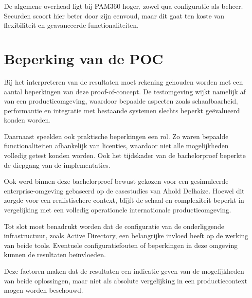De algemene overhead ligt bij PAM360 hoger, zowel qua configuratie als beheer. Securden scoort hier beter door zijn eenvoud, maar dit gaat ten koste van flexibiliteit en geavanceerde functionaliteiten.
\section{Beperking van de POC}
Bij het interpreteren van de resultaten moet rekening gehouden worden met een aantal beperkingen van deze proof-of-concept. De testomgeving wijkt namelijk af van een productieomgeving, waardoor bepaalde aspecten zoals schaalbaarheid, performantie en integratie met bestaande systemen slechts beperkt geëvalueerd konden worden.

Daarnaast speelden ook praktische beperkingen een rol. Zo waren bepaalde functionaliteiten afhankelijk van licenties, waardoor niet alle mogelijkheden volledig getest konden worden. Ook het tijdskader van de bachelorproef beperkte de diepgang van de implementaties.

Ook werd binnen deze bachelorproef bewust gekozen voor een gesimuleerde enterprise-omgeving gebaseerd op de casestudies van Ahold Delhaize. Hoewel dit zorgde voor een realistischere context, blijft de schaal en complexiteit beperkt in vergelijking met een volledig operationele internationale productieomgeving.

Tot slot moet benadrukt worden dat de configuratie van de onderliggende infrastructuur, zoals Active Directory, een belangrijke invloed heeft op de werking van beide tools. Eventuele configuratiefouten of beperkingen in deze omgeving kunnen de resultaten beïnvloeden.

Deze factoren maken dat de resultaten een indicatie geven van de mogelijkheden van beide oplossingen, maar niet als absolute vergelijking in een productiecontext mogen worden beschouwd.
